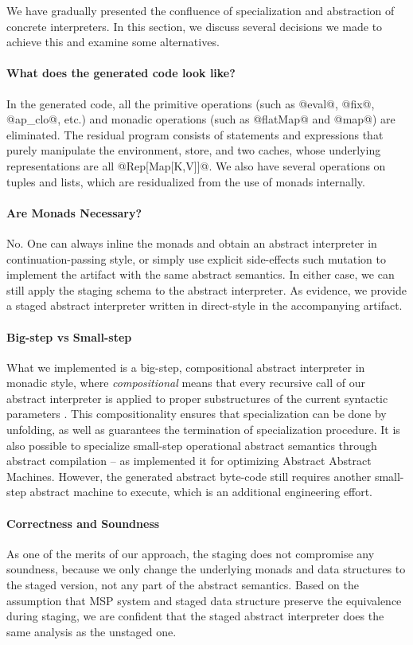 We have gradually presented the confluence of specialization and abstraction of
concrete interpreters. In this section, we discuss several decisions we made to
achieve this and examine some alternatives.

\paragraph{What does the generated code look like?} In the generated code, all the
primitive operations (such as @eval@, @fix@, @ap_clo@, etc.) and monadic
operations (such as @flatMap@ and @map@) are eliminated. The residual program
consists of statements and expressions that purely manipulate the environment,
store, and two caches, whose underlying representations are all @Rep[Map[K,V]]@. We
also have several operations on tuples and lists, which are residualized from
the use of monads internally.

\paragraph{Are Monads Necessary?} No. One can always inline the monads and
obtain an abstract interpreter in continuation-passing style, or simply use
explicit side-effects such mutation to implement the artifact with the same
abstract semantics. In either case, we can still apply the staging schema to
the abstract interpreter. As evidence, we provide a staged abstract
interpreter written in direct-style in the accompanying artifact.

\paragraph{Big-step vs Small-step}

What we implemented is a big-step, compositional abstract interpreter in monadic
style, where \textit{compositional} means that every recursive call of our abstract
interpreter is applied to proper substructures of the current syntactic
parameters \cite{10.1007/3-540-61580-6_11}. This compositionality ensures that
specialization can be done by unfolding, as well as guarantees the termination
of specialization procedure. It is also possible to specialize small-step
operational abstract semantics through abstract compilation
\cite{Boucher:1996:ACN:647473.727587} -- as
\citet{Johnson:2013:OAA:2500365.2500604} implemented it for
optimizing Abstract Abstract Machines. However, the generated abstract
byte-code still requires another small-step abstract machine to execute, which is
an additional engineering effort.

\paragraph{Correctness and Soundness}

As one of the merits of our approach, the staging does not compromise any
soundness, because we only change the underlying monads and data structures to
the staged version, not any part of the abstract semantics. Based on the
assumption that MSP system and staged data structure preserve the equivalence
during staging, we are confident that the staged abstract interpreter does the
same analysis as the unstaged one.

